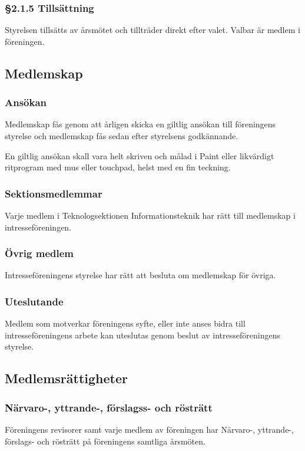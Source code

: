\documentclass[11pt, noincludeaddress]{classes/cthit}
\begin{document}
\subsubsection{§2.1.5 Tillsättning}
Styrelsen tillsätts av årsmötet och tillträder direkt efter
valet. Valbar är medlem i föreningen.


\subsection{Medlemskap}

\subsubsection{Ansökan}
Medlemskap fås genom att årligen skicka en giltlig ansökan till föreningens styrelse och medlemskap fås sedan efter styrelsens godkännande.

En giltlig ansökan skall vara helt skriven och målad i Paint eller likvärdigt ritprogram med mus eller touchpad, helst med en fin teckning.

\subsubsection{Sektionsmedlemmar}
Varje medlem i Teknologsektionen Informationsteknik har rätt till medlemskap i intresseföreningen.

\subsubsection{Övrig medlem}
Intresseföreningens styrelse har rätt att besluta om medlemskap för övriga.

\subsubsection{Uteslutande}
Medlem som motverkar föreningens syfte, eller inte anses bidra till intresseföreningens arbete kan uteslutas genom beslut av intresseföreningens styrelse. 

\subsection{Medlemsrättigheter}

\subsubsection{Närvaro-, yttrande-, förslagss- och rösträtt}
Föreningens revisorer samt varje medlem av föreningen har Närvaro-,
yttrande-, förslags- och rösträtt på föreningens samtliga årsmöten.
\end{document}
